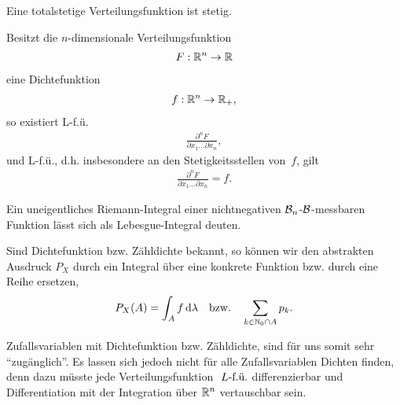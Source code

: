 \begin{bem}[Bemerkungen.]
\label{bem:4.3}
\begin{bemenum}
\item
Eine totalstetige Verteilungsfunktion ist stetig.
\item
Besitzt die $n$-dimensionale Verteilungsfunktion
\begin{align*}
F: \R^{n} \to \R
\end{align*}
eine Dichtefunktion
\begin{align*}
f: \R^{n} \to \R_{+},
\end{align*}
so existiert L-f.ü.
\begin{align*}
\frac{\partial^{n}F}{\partial x_{1} \ldots \partial x_{n}},
\end{align*}
und L-f.ü., d.h. insbesondere an den Stetigkeitsstellen von~$f$, gilt
\begin{align*}
\frac{\partial^{n}F}{\partial x_{1} \ldots \partial x_{n}} = f.
\end{align*}
\item
Ein uneigentliches Riemann-Integral einer nichtnegativen ${\BB}_{n}$-${\cal
B}$-messbaren Funktion lässt sich als Lebesgue-Integral deuten.\maphere
\end{bemenum}
\end{bem}

Sind Dichtefunktion bzw. Zähldichte bekannt, so können wir den abstrakten
Ausdruck $P_X$ durch ein Integral über eine konkrete Funktion bzw. durch eine
Reihe ersetzen,
\begin{align*}
P_X(A) = \int_A f\dlambda \quad \text{bzw.} \quad \sum\limits_{k\in\N_0\cap A}
p_k.
\end{align*}

Zufallsvariablen mit Dichtefunktion bzw. Zähldichte, sind für
uns somit sehr ``zugänglich''. Es lassen sich jedoch nicht für alle
Zufallsvariablen Dichten finden, denn dazu müsste jede Verteilungsfunktion
$\fu{L}$ differenzierbar und Differentiation mit der Integration über $\R^n$
vertauschbar sein.

